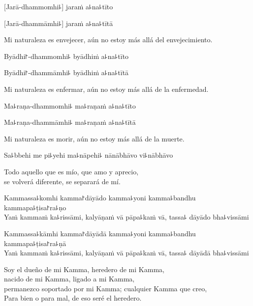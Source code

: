 %
[Jarā-dhammomhi꜕] jaraṁ a꜕na꜕tīto

%
[Jarā-dhammāmhi꜕] jaraṁ a꜕na꜕tītā

\begin{english}
  Mi naturaleza es envejecer, aún no estoy más allá del envejecimiento.
\end{english}

%
Byādhi꜓-dhammomhi꜕ byādhiṁ a꜕na꜕tīto

%
Byādhi꜓-dhammāmhi꜕ byādhiṁ a꜕na꜕tītā

\begin{english}
  Mi naturaleza es enfermar, aún no estoy más allá de la enfermedad.
\end{english}

%
Ma꜕raṇa-dhammomhi꜕ ma꜕raṇaṁ a꜕na꜕tīto

%
Ma꜕raṇa-dhammāmhi꜕ ma꜕raṇaṁ a꜕na꜕tītā

\begin{english}
  Mi naturaleza es morir, aún no estoy más allá de la muerte.
\end{english}

Sa꜕bbehi me pi꜕yehi ma꜕nāpehi꜕ nānābhāvo vi꜕nābhāvo

\begin{english}
  Todo aquello que es mío, que amo y aprecio,\\
  se volverá diferente, se separará de mí.
\end{english}

%
Kammassa꜕komhi kamma꜓dāyādo kamma꜕yoni kamma꜕bandhu kammapa꜕ṭisa꜓ra꜕ṇo\\
Yaṁ kammaṁ ka꜕rissāmi, kalyāṇaṁ vā pāpa꜕kaṁ vā, tassa꜕ dāyādo bha꜕vissāmi

\clearpage

%
Kammassa꜕kāmhi kamma꜓dāyādā kamma꜕yoni kamma꜕bandhu kammapa꜕ṭisa꜓ra꜕ṇā\\
Yaṁ kammaṁ ka꜕rissāmi, kalyāṇaṁ vā pāpa꜕kaṁ vā, tassa꜕ dāyādā bha꜕vissāmi

\begin{english}
  Soy el dueño de mi Kamma, heredero de mi Kamma, \\
  nacido de mi Kamma, ligado a mi Kamma,\\
  permanezco soportado por mi Kamma; cualquier Kamma que creo, \\
  Para bien o para mal, de eso seré el heredero.
\end{english}

